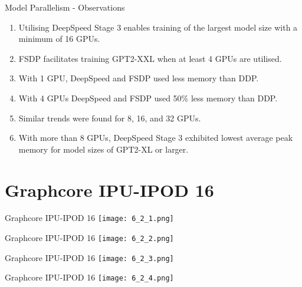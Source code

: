 \documentclass[t]{beamer}
\begin{document}
\begin{frame}{Model Parallelism - Observations}

\begin{enumerate}
  \item Utilising DeepSpeed Stage 3 enables training of the largest model size with a minimum of 16 GPUs.
  \item FSDP facilitates training GPT2-XXL when at least 4 GPUs are utilised.
  \item With 1 GPU, DeepSpeed and FSDP used less memory than DDP.
  \item With 4 GPUs DeepSpeed and FSDP used 50\% less memory than DDP.
  \item Similar trends were found for 8, 16, and 32 GPUs.
  \item With more than 8 GPUs, DeepSpeed Stage 3 exhibited lowest average peak memory for model sizes of GPT2-XL or larger.
\end{enumerate}

\end{frame}

\section{Graphcore IPU-IPOD 16}

\begin{frame}{Graphcore IPU-IPOD 16}
\texttt{[image: 6\_2\_1.png]}
\end{frame}

\begin{frame}{Graphcore IPU-IPOD 16}
\texttt{[image: 6\_2\_2.png]}
\end{frame}

\begin{frame}{Graphcore IPU-IPOD 16}
\texttt{[image: 6\_2\_3.png]}
\end{frame}

\begin{frame}{Graphcore IPU-IPOD 16}
\texttt{[image: 6\_2\_4.png]}
\end{frame}
\end{document}
